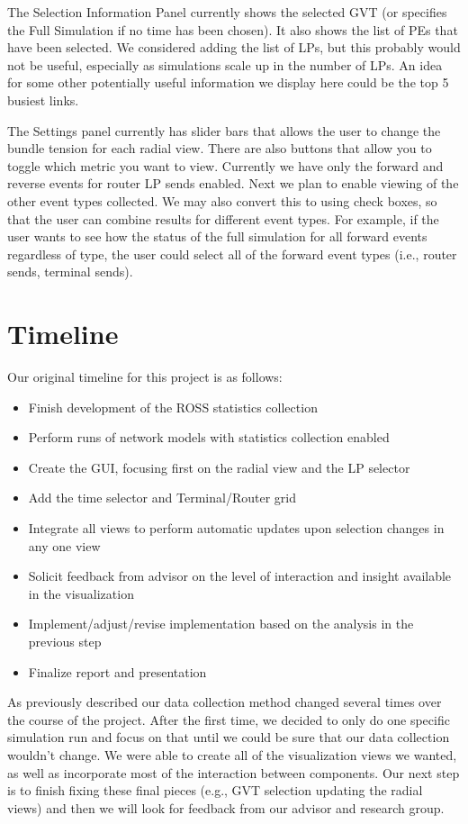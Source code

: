 \documentclass{acm_proc_article-sp}
\begin{document}
The Selection Information Panel currently shows the selected GVT (or specifies the Full Simulation if no time has been chosen).  It also shows the list of PEs that have been selected.  We considered adding the list of LPs, but this probably would not be useful, especially as simulations scale up in the number of LPs.  An idea for some other potentially useful information we  display here could be the top 5 busiest links.

The Settings panel currently has slider bars that allows the user to change the bundle tension for each radial view.  There are also buttons that allow you to toggle which metric you want to view.  Currently we have only the forward and reverse events for router LP sends enabled.  Next we plan to enable viewing of the other event types collected.  We may also convert this to using check boxes, so that the user can combine results for different event types.  For example, if the user wants to see how the status of the full simulation for all forward events regardless of type, the user could select all of the forward event types (i.e., router sends, terminal sends).  



\section{Timeline}
Our original timeline for this project is as follows:
\begin{itemize}
\item Finish development of the ROSS statistics collection
\item Perform runs of network models with statistics collection enabled
\item Create the GUI, focusing first on the radial view and the LP selector
\item Add the time selector and Terminal/Router grid
\item Integrate all views to perform automatic updates upon selection changes in any one view
\item Solicit feedback from advisor on the level of interaction and insight available in the visualization
\item Implement/adjust/revise implementation based on the analysis in the previous step
\item Finalize report and presentation
\end{itemize}

As previously described our data collection method changed several times over the course of the project.  After the first time, we decided to only do one specific simulation run and focus on that until we could be sure that our data collection wouldn't change.  We were able to create all of the visualization views we wanted, as well as incorporate most of the interaction between components.    Our next step is to finish fixing these final pieces (e.g., GVT selection updating the radial views) and then we will look for feedback from our advisor and research group.  
\end{document}
